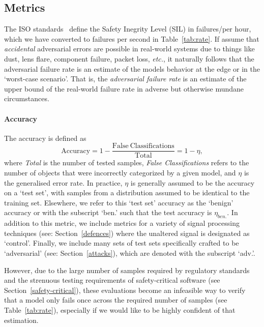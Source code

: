 \documentclass[journal]{IEEEtran}
\begin{document}
\subsection{Metrics}


\label{metrics}
The ISO standards~\cite{iso26262} define the Safety Inegrity Level (SIL) in failures/per hour, which we have converted to failures per second in Table~\ref{tab:rate}.
If assume that \textit{accidental} adversarial errors are possible in real-world systems due to things like dust, lens flare, component failure, packet loss, \textit{etc.}, it naturally follows that the adversarial failure rate is an estimate of the models behavior at the edge or in the `worst-case scenario'.
That is, the \textit{adversarial failure rate} is an estimate of the upper bound of the real-world failure rate in adverse but otherwise mundane circumstances.




\paragraph{Accuracy}

The accuracy is defined as
\begin{equation}\label{eq:accuracy}
    \mathrm{Accuracy}
    = 1 - \frac{\mathrm{False~Classifications}}{\mathrm{Total}}
    = 1 - \eta,
\end{equation}
where \textit{Total} is the number of tested samples, \textit{False Classifications} refers to the number of objects that were incorrectly categorized by a given model, and $\eta$ is the generalised error rate.
In practice, $\eta$ is generally assumed to be the accuracy on a `test set', with samples from a distribution assumed to be identical to the training set.
Elsewhere, we refer to this `test set' accuracy as the `benign' accuracy or with the subscript `ben.' such that the test accuracy is $\eta_{ben.}$.
In addition to this metric, we include metrics for a variety of signal processing techniques (see: Section~\ref{defences}) where the unaltered signal is designated as `control'.
Finally, we include many sets of test sets specifically crafted to be `adversarial' (see: Section~\ref{attacks}), which are denoted with the subscript `adv.'.

However, due to the large number of samples required by regulatory standards  and the strenuous testing requirements of safety-critical software (see Section~\ref{safety-critical}), these evaluations become an infeasible way to verify that a model only fails once across the required number of samples (see Table~\ref{tab:rate}), especially if we would like to be highly confident of that estimation.
\end{document}
